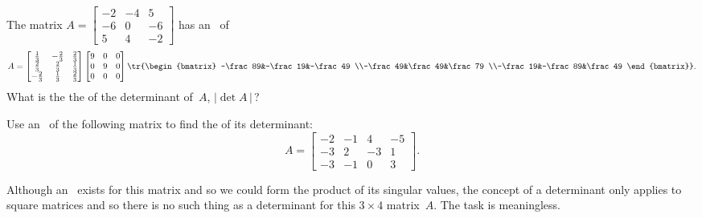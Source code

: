 \begin{activity}
The matrix
\(A=\begin{bmatrix} -2&-4&5
\\-6&0&-6
\\5&4&-2 \end{bmatrix}\)
has an \svd\ of
\begin{equation*}
A=\begin{bmatrix} \frac13&-\frac23&\frac23
\\\frac23&\frac23&\frac13
\\-\frac23&\frac13&\frac23 \end{bmatrix}
\begin{bmatrix} 9&0&0\\0&9&0\\0&0&0 \end{bmatrix}
\tr{\begin{bmatrix} -\frac89&-\frac19&-\frac49
\\-\frac49&\frac49&\frac79
\\-\frac19&-\frac89&\frac49 \end{bmatrix}}.
\end{equation*}
What is the the  of the determinant of~\(A\), \(|\det A\,|\)\,?
\end{activity}




\begin{example} \label{eg:}
Use an \svd\ of the following matrix to find the  of its determinant:
\begin{equation*}
A=\begin{bmatrix}-2&-1&4&-5
\\-3&2&-3&1
\\-3&-1&0&3
\end{bmatrix}.
\end{equation*}
\begin{solution} 
Although an \svd\ exists for this matrix and so we could form the product of its singular values, the concept of a determinant only applies to square matrices and so there is no such thing as a determinant for this \(3\times4\) matrix~\(A\).
The task is meaningless.
\end{solution}
\end{example}




